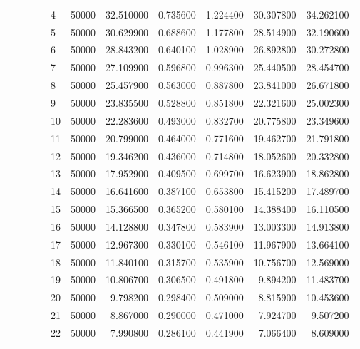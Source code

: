 \begin{tabular}{llllllrrrrr}
\cline{5-11}
 &  &  &  & 4 & 50000 & 32.510000 & 0.735600 & 1.224400 & 30.307800 & 34.262100 \\
\cline{5-11}
 &  &  &  & 5 & 50000 & 30.629900 & 0.688600 & 1.177800 & 28.514900 & 32.190600 \\
\cline{5-11}
 &  &  &  & 6 & 50000 & 28.843200 & 0.640100 & 1.028900 & 26.892800 & 30.272800 \\
\cline{5-11}
 &  &  &  & 7 & 50000 & 27.109900 & 0.596800 & 0.996300 & 25.440500 & 28.454700 \\
\cline{5-11}
 &  &  &  & 8 & 50000 & 25.457900 & 0.563000 & 0.887800 & 23.841000 & 26.671800 \\
\cline{5-11}
 &  &  &  & 9 & 50000 & 23.835500 & 0.528800 & 0.851800 & 22.321600 & 25.002300 \\
\cline{5-11}
 &  &  &  & 10 & 50000 & 22.283600 & 0.493000 & 0.832700 & 20.775800 & 23.349600 \\
\cline{5-11}
 &  &  &  & 11 & 50000 & 20.799000 & 0.464000 & 0.771600 & 19.462700 & 21.791800 \\
\cline{5-11}
 &  &  &  & 12 & 50000 & 19.346200 & 0.436000 & 0.714800 & 18.052600 & 20.332800 \\
\cline{5-11}
 &  &  &  & 13 & 50000 & 17.952900 & 0.409500 & 0.699700 & 16.623900 & 18.862800 \\
\cline{5-11}
 &  &  &  & 14 & 50000 & 16.641600 & 0.387100 & 0.653800 & 15.415200 & 17.489700 \\
\cline{5-11}
 &  &  &  & 15 & 50000 & 15.366500 & 0.365200 & 0.580100 & 14.388400 & 16.110500 \\
\cline{5-11}
 &  &  &  & 16 & 50000 & 14.128800 & 0.347800 & 0.583900 & 13.003300 & 14.913800 \\
\cline{5-11}
 &  &  &  & 17 & 50000 & 12.967300 & 0.330100 & 0.546100 & 11.967900 & 13.664100 \\
\cline{5-11}
 &  &  &  & 18 & 50000 & 11.840100 & 0.315700 & 0.535900 & 10.756700 & 12.569000 \\
\cline{5-11}
 &  &  &  & 19 & 50000 & 10.806700 & 0.306500 & 0.491800 & 9.894200 & 11.483700 \\
\cline{5-11}
 &  &  &  & 20 & 50000 & 9.798200 & 0.298400 & 0.509000 & 8.815900 & 10.453600 \\
\cline{5-11}
 &  &  &  & 21 & 50000 & 8.867000 & 0.290000 & 0.471000 & 7.924700 & 9.507200 \\
\cline{5-11}
 &  &  &  & 22 & 50000 & 7.990800 & 0.286100 & 0.441900 & 7.066400 & 8.609000 \\
\cline{5-11}

\end{tabular}
